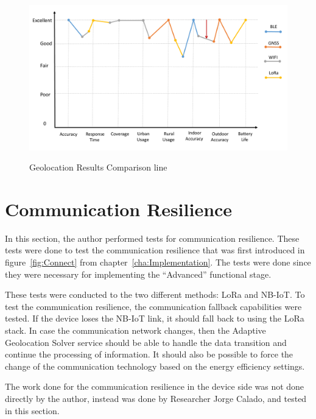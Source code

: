 \begin{figure}[htbp]
  \centering
  
    {\includegraphics[width=0.8\linewidth]{Chapters/Figures/radarline.pdf}}%
 
  \caption{Geolocation Results Comparison line}
  \label{fig:radarline}
\end{figure}


\newpage

\section{Communication Resilience}
\label{sec:Comunication_Resilience}

In this section, the author performed tests for communication resilience. These tests were done to test the communication resilience that was first introduced in figure~\ref{fig:Connect} from chapter~\ref{cha:Implementation}. The tests were done since they were necessary for implementing the “Advanced” functional stage.

These tests were conducted to the two different methods: LoRa and NB-IoT. To test the communication resilience, the communication fallback capabilities were tested. If the device loses the NB-IoT link, it should fall back to using the LoRa stack.
In case the communication network changes, then the Adaptive Geolocation Solver service should be able to handle the data transition and continue the processing of information. It should also be possible to force the change of the communication technology based on the energy efficiency settings.



The work done for the communication resilience in the device side was not done directly by the author, instead was done by Researcher Jorge Calado, and tested in this section.

